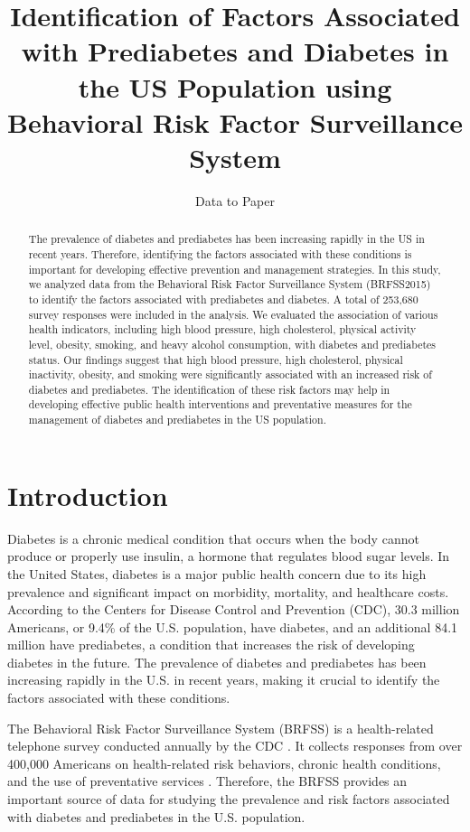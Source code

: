 \documentclass[12pt]{article}
\title{Identification of Factors Associated with Prediabetes and Diabetes in the US Population using Behavioral Risk Factor Surveillance System}
\author{Data to Paper}
\begin{document}
\maketitle

\begin{abstract}
The prevalence of diabetes and prediabetes has been increasing rapidly in the US in recent years. Therefore, identifying the factors associated with these conditions is important for developing effective prevention and management strategies. In this study, we analyzed data from the Behavioral Risk Factor Surveillance System (BRFSS2015) to identify the factors associated with prediabetes and diabetes. A total of 253,680 survey responses were included in the analysis. We evaluated the association of various health indicators, including high blood pressure, high cholesterol, physical activity level, obesity, smoking, and heavy alcohol consumption, with diabetes and prediabetes status. Our findings suggest that high blood pressure, high cholesterol, physical inactivity, obesity, and smoking were significantly associated with an increased risk of diabetes and prediabetes. The identification of these risk factors may help in developing effective public health interventions and preventative measures for the management of diabetes and prediabetes in the US population.
\end{abstract}

\section{Introduction}

Diabetes is a chronic medical condition that occurs when the body cannot produce or properly use insulin, a hormone that regulates blood sugar levels. In the United States, diabetes is a major public health concern due to its high prevalence and significant impact on morbidity, mortality, and healthcare costs. According to the Centers for Disease Control and Prevention (CDC), 30.3 million Americans, or 9.4\% of the U.S. population, have diabetes, and an additional 84.1 million have prediabetes, a condition that increases the risk of developing diabetes in the future. The prevalence of diabetes and prediabetes has been increasing rapidly in the U.S. in recent years, making it crucial to identify the factors associated with these conditions.

The Behavioral Risk Factor Surveillance System (BRFSS) is a health-related telephone survey conducted annually by the CDC \cite{Holtzman2003Analysis}. It collects responses from over 400,000 Americans on health-related risk behaviors, chronic health conditions, and the use of preventative services \cite{Iezzoni2010Multiple}. Therefore, the BRFSS provides an important source of data for studying the prevalence and risk factors associated with diabetes and prediabetes in the U.S. population.
\end{document}
